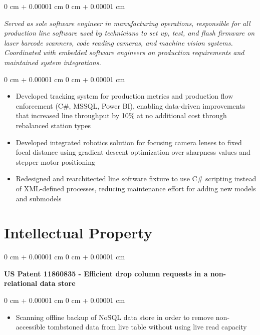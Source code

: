 \documentclass[10pt, letterpaper]{article}
\newenvironment{highlights}{
    \begin{itemize}[
        topsep=0.10 cm,
        parsep=0.10 cm,
        partopsep=0pt,
        itemsep=0pt,
        leftmargin=0 cm + 10pt
    ]
}{
    \end{itemize}
} %
\newenvironment{onecolentry}{
    \begin{adjustwidth}{
        0 cm + 0.00001 cm
    }{
        0 cm + 0.00001 cm
    }
}{
    \end{adjustwidth}
} %
\newenvironment{twocolentry}[2][]{
    \onecolentry
    \def\secondColumn{#2}
    \setcolumnwidth{\fill, 4.5 cm}
    \begin{paracol}{2}
}{
    \switchcolumn \raggedleft \secondColumn
    \end{paracol}
    \endonecolentry
} %
\begin{document}
        \vspace{0.05 cm}
        \begin{onecolentry}
            \textit{Served as sole software engineer in manufacturing operations, responsible for all production line software used by technicians to set up, test, and flash firmware on laser barcode scanners, code reading cameras, and machine vision systems. Coordinated with embedded software engineers on production requirements and maintained system integrations.}
        \end{onecolentry}

        \vspace{0.05 cm}
        \begin{onecolentry}
            \begin{highlights}
                \item Developed tracking system for production metrics and production flow enforcement (C\#, MSSQL, Power BI), enabling data-driven improvements that increased line throughput by 10\% at no additional cost through rebalanced station types
                \item Developed integrated robotics solution for focusing camera lenses to fixed focal distance using gradient descent optimization over sharpness values and stepper motor positioning
                \item Redesigned and rearchitected line software fixture to use C\# scripting instead of XML-defined processes, reducing maintenance effort for adding new models and submodels
            \end{highlights}
        \end{onecolentry}

    
    \section{Intellectual Property}

        \begin{samepage}
            \begin{twocolentry}{
            
            }
                \textbf{US Patent 11860835 - Efficient drop column requests in a non-relational data store}
            \end{twocolentry}

            \vspace{0.10 cm}
            
            \begin{onecolentry}
                \begin{highlights}
                    \item Scanning offline backup of NoSQL data store in order to remove non-accessible tombstoned data from live table without using live read capacity
                \end{highlights}
            \end{onecolentry}
        \end{samepage}
\end{document}
